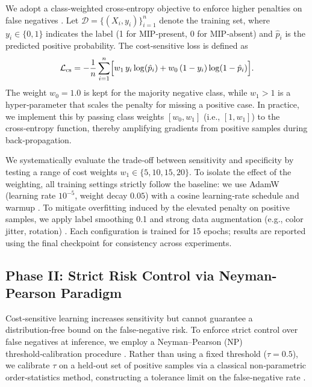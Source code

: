 \documentclass[sigconf,review,anonymous]{acmart}
\theoremstyle{remark}
\begin{document}
We adopt a class‑weighted cross‑entropy objective to enforce higher penalties on false negatives \cite{he2009learning}.  
Let \(\mathcal{D} = \{(X_i, y_i)\}_{i=1}^{n}\) denote the training set, where \(y_i \in \{0,1\}\) indicates the label (1 for MIP‑present, 0 for MIP‑absent) and \(\hat{p}_i\) is the predicted positive probability. The cost‑sensitive loss is defined as  
\begin{equation*}
    \mathcal{L}_{\mathrm{cs}} = - \frac{1}{n} \sum_{i=1}^{n} \Bigl[ w_{1} \, y_i \log(\hat{p}_i) + w_{0} \, (1-y_i) \log(1-\hat{p}_i) \Bigr].
\end{equation*}
The weight \(w_{0}=1.0\) is kept for the majority negative class, while \(w_{1} > 1\) is a hyper‑parameter that scales the penalty for missing a positive case.  
In practice, we implement this by passing class weights \([w_{0}, w_{1}]\) (i.e., \([1, w_{1}]\)) to the cross‑entropy function, thereby amplifying gradients from positive samples during back‑propagation.

We systematically evaluate the trade‑off between sensitivity and specificity by testing a range of cost weights \(w_{1} \in \{5, 10, 15, 20\}\).  To isolate the effect of the weighting, all training settings strictly follow the baseline: we use AdamW \cite{loshchilov2017decoupled} (learning rate \(10^{-5}\), weight decay \(0.05\)) with a cosine learning‑rate schedule and warmup \cite{loshchilov2016sgdr}. To mitigate overfitting induced by the elevated penalty on positive samples, we apply label smoothing 0.1 \cite{szegedy2016rethinking} and strong data augmentation (e.g., color jitter, rotation) \cite{buslaev2020albumentations}. Each configuration is trained for 15 epochs; results are reported using the final checkpoint for consistency across experiments.

\subsection{Phase II: Strict Risk Control via Neyman-Pearson Paradigm}
\label{sec:phase2_method}

Cost‑sensitive learning increases sensitivity but cannot guarantee a distribution‑free bound on the false‑negative risk. To enforce strict control over false negatives at inference, we employ a Neyman–Pearson (NP) threshold‑calibration procedure \cite{rigollet2011neyman,tong2018neyman}. Rather than using a fixed threshold (\(\tau = 0.5\)), we calibrate \(\tau\) on a held‑out set of positive samples via a classical non‑parametric order‑statistics method, constructing a tolerance limit on the false‑negative rate \cite{wilks1941determination}.
\end{document}
